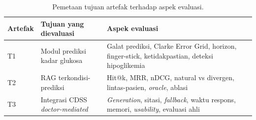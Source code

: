 \begin{table}[!htbp]
    \centering
    \caption{Pemetaan tujuan artefak terhadap aspek evaluasi.}
    \label{tab:tab6.1_pemetaan_tujuan_artefak_dan_evaluasi}
    \begin{tabular}{p{}p{}p{}}
        \hline
        \textbf{Artefak} & \textbf{Tujuan yang dievaluasi} & \textbf{Aspek evaluasi} \\
        \hline
        T1 & Modul prediksi kadar glukosa & Galat prediksi, Clarke Error Grid, horizon, finger-stick, ketidakpastian, deteksi hipoglikemia \\
        T2 & RAG terkondisi-prediksi & Hit@k, MRR, nDCG, natural vs divergen, lintas-pasien, \textit{oracle}, ablasi \\
        T3 & Integrasi CDSS \textit{doctor-mediated} & \textit{Generation}, sitasi, \textit{fallback}, waktu respons, memori, \textit{usability}, evaluasi ahli \\
        \hline
    \end{tabular}
\end{table}

